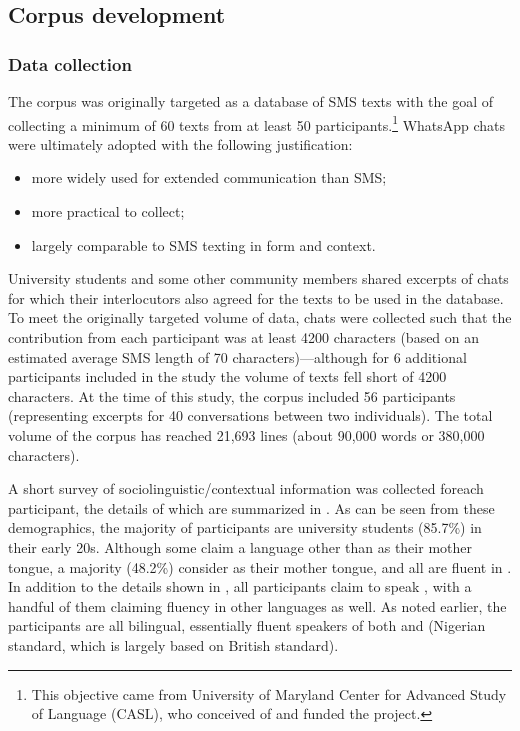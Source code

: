 \documentclass[output=paper
,newtxmath
,modfonts
,nonflat]{langsci/langscibook}
\begin{document}
\subsection{Corpus development}
\subsubsection{Data collection}

The corpus was originally targeted as a database of SMS texts with the goal of collecting a minimum of 60 texts from at least 50 participants.\footnote{This objective came from University of Maryland Center for Advanced Study of Language (CASL), who conceived of and funded the project.} WhatsApp chats were ultimately adopted with the following justification:

\begin{itemize}
\item more widely used for extended communication than SMS; 

\item more practical to collect;

\item largely comparable to SMS texting in form and context.
\end{itemize}

University students and some other community members shared excerpts of chats for which their interlocutors also agreed for the texts to be used in the database. To meet the originally targeted volume of data, chats were collected such that the contribution from each participant was at least 4200 characters (based on an estimated average SMS length of 70 characters)—although for 6 additional participants included in the study the volume of texts fell short of 4200 characters. At the time of this study, the corpus included 56 participants (representing excerpts for 40 conversations between two individuals). The total volume of the corpus has reached 21,693 lines (about 90,000 words or 380,000 characters).

A short survey of sociolinguistic\slash contextual information was collected for\linebreak each participant, the details of which are summarized in . As can be seen from these demographics, the majority of participants are university students (85.7\%) in their early 20s. Although some claim a language other than  as their mother tongue, a majority (48.2\%) consider  as their mother tongue, and all are fluent in . In addition to the details shown in , all participants claim to speak , with a handful of them claiming fluency in other languages as well. As noted earlier, the participants are all bilingual, essentially fluent speakers of both  and  (Nigerian standard, which is largely based on British standard).
\end{document}
